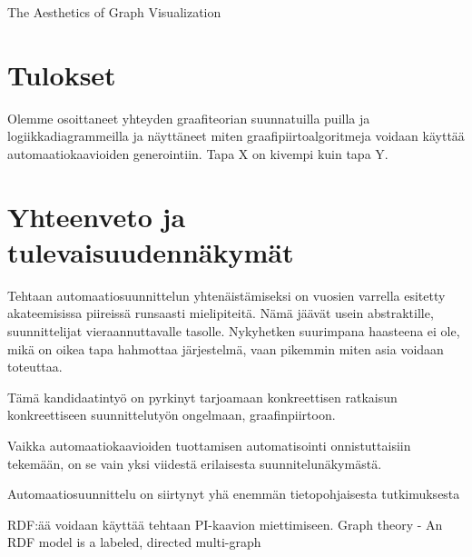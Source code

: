 \documentclass[finnish,12pt]{article}
\begin{document}
The Aesthetics of Graph Visualization

	\clearpage
	\section{Tulokset}
	
Olemme osoittaneet yhteyden graafiteorian suunnatuilla puilla ja
logiikkadiagrammeilla ja näyttäneet miten graafipiirtoalgoritmeja voidaan
käyttää automaatiokaavioiden generointiin.
Tapa X on kivempi kuin tapa Y.

	\section{Yhteenveto ja tulevaisuudennäkymät}

Tehtaan automaatiosuunnittelun yhtenäistämiseksi on vuosien varrella esitetty akateemisissa piireissä
runsaasti mielipiteitä. Nämä jäävät usein abstraktille, suunnittelijat vieraannuttavalle tasolle.
Nykyhetken suurimpana haasteena ei ole, mikä on oikea tapa hahmottaa järjestelmä, vaan pikemmin
miten asia voidaan toteuttaa.

Tämä kandidaatintyö on pyrkinyt tarjoamaan konkreettisen ratkaisun konkreettiseen suunnittelutyön ongelmaan, graafinpiirtoon. 

Vaikka automaatiokaavioiden tuottamisen automatisointi onnistuttaisiin tekemään,
on se vain yksi viidestä erilaisesta suunnitelunäkymästä.

Automaatiosuunnittelu on siirtynyt yhä enemmän tietopohjaisesta tutkimuksesta

RDF:ää voidaan käyttää tehtaan PI-kaavion miettimiseen.
Graph theory - An RDF model is a labeled, directed multi-graph


\clearpage
{}


\end{document}
